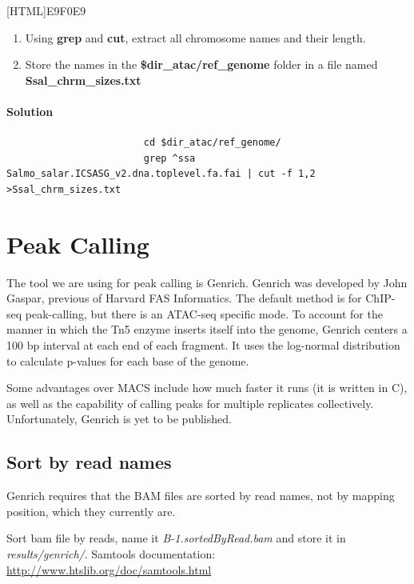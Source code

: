\documentclass[12pt]{article}
\begin{document}
			[HTML]{E9F0E9}{\parbox{\linewidth}{%
					\begin{enumerate}
						\item Using \textbf{grep} and \textbf{cut}, extract all chromosome names and their length.
						\item Store the names in the \textbf{\$dir\_atac/ref\_genome} folder in a file named \textbf{Ssal\_chrm\_sizes.txt}
					\end{enumerate}
			}}
			
			\paragraph{Solution}
			
				\begin{minipage}{\linewidth}
					\begin{lstlisting}
						cd $dir_atac/ref_genome/
						grep ^ssa Salmo_salar.ICSASG_v2.dna.toplevel.fa.fai | cut -f 1,2 >Ssal_chrm_sizes.txt
					\end{lstlisting}
				\end{minipage}
	
	\section{Peak Calling} 
		The tool we are using for peak calling is Genrich. Genrich was  developed by John Gaspar, previous of Harvard FAS Informatics. 
		The default method is for ChIP-seq peak-calling, but there is an ATAC-seq specific mode. 
		To account for the manner in which the Tn5 enzyme inserts itself into the genome, Genrich centers a 100 bp interval at each end of each fragment. 
		It uses the log-normal distribution to calculate p-values for each base of the genome.
		
		Some advantages over MACS include how much faster it runs (it is written in C), as well as the capability of calling peaks for multiple replicates collectively. 
		Unfortunately, Genrich is yet to be published.
		
		\subsection{Sort by read names}
			Genrich requires that the BAM files are sorted by read names, not by mapping position, which they currently are.
			
			Sort bam file by reads, name it \textit{B-1.sortedByRead.bam} and store it in \textit{results/genrich/}. Samtools documentation: \url{http://www.htslib.org/doc/samtools.html}	
			
\end{document}
